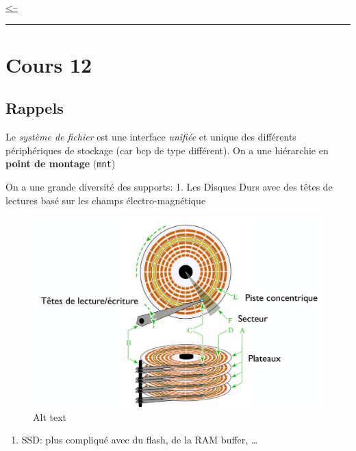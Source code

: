 \href{../README.md}{\textless--}

\begin{center}\rule{0.5\linewidth}{0.5pt}\end{center}

\section{Cours 12}\label{cours-12}

\subsection{Rappels}\label{rappels}

Le \emph{système de fichier} est une interface \emph{unifiée} et unique
des différents périphériques de stockage (car bcp de type différent). On
a une hiérarchie en \textbf{point de montage} (\texttt{mnt})

On a une grande diversité des supports: 1. Les Disques Durs avec des
têtes de lectures basé sur les champs électro-magnétique

\begin{figure}
\centering
\includegraphics{image-35.png}
\caption{Alt text}
\end{figure}

\begin{enumerate}
\def\labelenumi{\arabic{enumi}.}
\setcounter{enumi}{1}
\tightlist
\item
  SSD: plus compliqué avec du flash, de la RAM buffer, \ldots{}
\end{enumerate}

